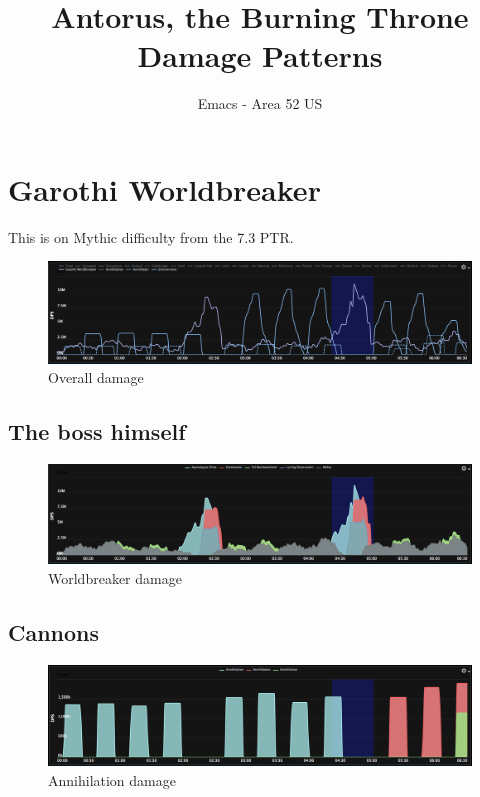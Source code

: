 \documentclass{article}
\title{Antorus, the Burning Throne Damage Patterns}
\author{Emacs - Area 52 US}
\begin{document}
\maketitle

\newpage
{}
\tableofcontents

\newpage
\section{Garothi Worldbreaker}

This is on Mythic difficulty from the 7.3 PTR.

\begin{figure}[!htb]
  \includegraphics[width=\linewidth]{01-overall.png}
  \caption{Overall damage}
  \label{fig:dmg1}
\end{figure}

\subsection{The boss himself}
\begin{figure}[!htb]
  \includegraphics[width=\linewidth]{01-worldbreaker.png}
  \caption{Worldbreaker damage}
  \label{fig:dmg1}
\end{figure}

\subsection{Cannons}
\begin{figure}[!htb]
  \includegraphics[width=\linewidth]{01-annihilation.png}
  \caption{Annihilation damage}
  \label{fig:dmg1}
\end{figure}
\end{document}
